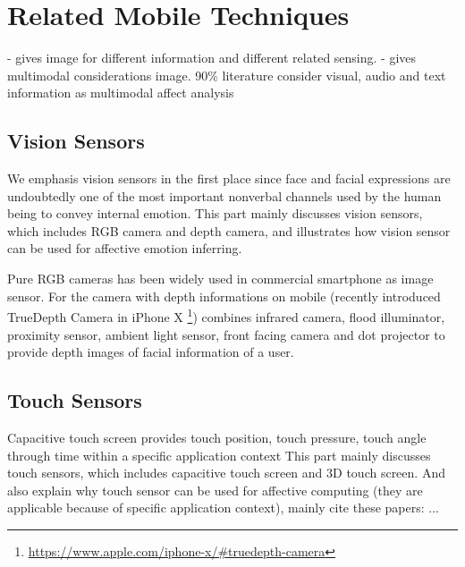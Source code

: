 \section{Related Mobile Techniques}\label{sec:mobile}

- \cite{Tao2005} gives image for different information and different related sensing.
- \cite{Poria2017} gives multimodal considerations image. 90\% literature consider visual, audio and text information as multimodal affect analysis

\subsection{Vision Sensors}\label{subsec:vision}
We emphasis vision sensors in the first place since face and facial expressions are undoubtedly one of the most important nonverbal channels used by the human being to convey internal emotion. This part mainly discusses vision sensors, which includes RGB camera and depth camera, and illustrates how vision sensor can be used for affective emotion inferring.

Pure RGB cameras has been widely used in commercial smartphone as image sensor. 
For the camera with depth informations on mobile (recently introduced TrueDepth Camera in iPhone X \footnote{\url{https://www.apple.com/iphone-x/\#truedepth-camera}}) combines infrared camera, flood illuminator, proximity sensor, ambient light sensor, front facing camera and dot projector to provide depth images of facial information of a user.

\cite{}


\subsection{Touch Sensors}\label{subsec:touch}
Capacitive touch screen provides touch position, touch pressure, touch angle through time within a specific application context
\cite{Hertenstein2009, Gao2012, Shah2015, bhattacharya2017predictive}
This part mainly discusses touch sensors, which includes capacitive touch screen and 3D touch screen.
And also explain why touch sensor can be used for affective computing (they are applicable
because of specific application context), mainly cite these papers: ...

